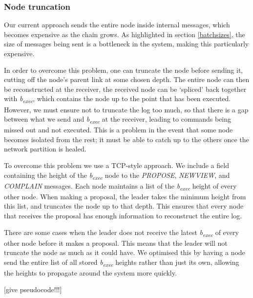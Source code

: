 \subsubsection{Node truncation} \label{truncation}
Our current approach sends the entire node inside internal messages, which becomes expensive as the chain grows. As highlighted in section \ref{batchsizes}, the size of messages being sent is a bottleneck in the system, making this particularly expensive.

In order to overcome this problem, one can truncate the node before sending it, cutting off the node's parent link at some chosen depth. The entire node can then be reconstructed at the receiver, the received node can be `spliced' back together with \textit{b\textsubscript{exec}}, which contains the node up to the point that has been executed. However, we must ensure not to truncate the log too much, so that there is a gap between what we send and \textit{b\textsubscript{exec}} at the receiver, leading to commands being missed out and not executed. This is a problem in the event that some node becomes isolated from the rest; it must be able to catch up to the others once the network partition is healed.

To overcome this problem we use a TCP-style approach. We include a field containing the height of the \textit{b\textsubscript{exec}} node to the \textit{PROPOSE}, \textit{NEW{\large V}IEW}, and \textit{COMPLAIN} messages. Each node maintains a list of the \textit{b\textsubscript{exec}} height of every other node. When making a proposal, the leader takes the minimum height from this list, and truncates the node up to that depth. This ensures that every node that receives the proposal has enough information to reconstruct the entire log.

There are some cases when the leader does not receive the latest \textit{b\textsubscript{exec}} of every other node before it makes a proposal. This means that the leader will not truncate the node as much as it could have. We optimised this by having a node send the entire list of all stored \textit{b\textsubscript{exec}} heights rather than just its own, allowing the heights to propagate around the system more quickly.

[give pseudocode!!!]


